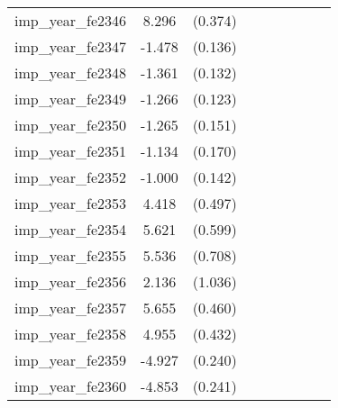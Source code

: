 {\begin{tabular}{l*{4}{cc}}
imp\_year\_fe2346&    8.296\sym{***}&  (0.374)&                  &         &                  &         &                  &         \\
imp\_year\_fe2347&   -1.478\sym{***}&  (0.136)&                  &         &                  &         &                  &         \\
imp\_year\_fe2348&   -1.361\sym{***}&  (0.132)&                  &         &                  &         &                  &         \\
imp\_year\_fe2349&   -1.266\sym{***}&  (0.123)&                  &         &                  &         &                  &         \\
imp\_year\_fe2350&   -1.265\sym{***}&  (0.151)&                  &         &                  &         &                  &         \\
imp\_year\_fe2351&   -1.134\sym{***}&  (0.170)&                  &         &                  &         &                  &         \\
imp\_year\_fe2352&   -1.000\sym{***}&  (0.142)&                  &         &                  &         &                  &         \\
imp\_year\_fe2353&    4.418\sym{***}&  (0.497)&                  &         &                  &         &                  &         \\
imp\_year\_fe2354&    5.621\sym{***}&  (0.599)&                  &         &                  &         &                  &         \\
imp\_year\_fe2355&    5.536\sym{***}&  (0.708)&                  &         &                  &         &                  &         \\
imp\_year\_fe2356&    2.136\sym{*}  &  (1.036)&                  &         &                  &         &                  &         \\
imp\_year\_fe2357&    5.655\sym{***}&  (0.460)&                  &         &                  &         &                  &         \\
imp\_year\_fe2358&    4.955\sym{***}&  (0.432)&                  &         &                  &         &                  &         \\
imp\_year\_fe2359&   -4.927\sym{***}&  (0.240)&                  &         &                  &         &                  &         \\
imp\_year\_fe2360&   -4.853\sym{***}&  (0.241)&                  &         &                  &         &                  &         \\

\end{tabular}}

